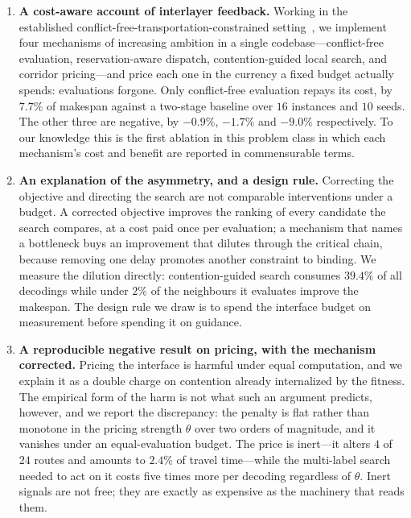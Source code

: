 \documentclass[manuscript,screen,review]{acmart}
\begin{document}
\begin{enumerate}[leftmargin=*]

\item \textbf{A cost-aware account of interlayer feedback.} Working
in the established conflict-free-\allowbreak transportation-constrained
setting~\cite{vanos2026exact}, we implement four mechanisms of increasing
ambition in a single codebase---conflict-free evaluation, reservation-aware
dispatch, contention-guided local search, and corridor pricing---and price each
one in the currency a fixed budget actually spends: evaluations forgone. Only
conflict-free evaluation repays its cost, by $7.7\%$ of makespan against a
two-stage baseline over $16$ instances and $10$ seeds. The other three are
negative, by $-0.9\%$, $-1.7\%$ and $-9.0\%$ respectively. To our knowledge this
is the first ablation in this problem class in which each mechanism's cost and
benefit are reported in commensurable terms.

\item \textbf{An explanation of the asymmetry, and a design rule.} Correcting the
objective and directing the search are not comparable interventions under a
budget. A corrected objective improves the ranking of every candidate the search
compares, at a cost paid once per evaluation; a mechanism that names a bottleneck
buys an improvement that dilutes through the critical chain, because removing one
delay promotes another constraint to binding. We measure the dilution directly:
contention-guided search consumes $39.4\%$ of all decodings while under $2\%$ of
the neighbours it evaluates improve the makespan. The design rule we draw is to
spend the interface budget on measurement before spending it on guidance.

\item \textbf{A reproducible negative result on pricing, with the mechanism
corrected.} Pricing the interface is harmful under equal computation, and we
explain it as a double charge on contention already internalized by the fitness.
The empirical form of the harm is not what such an argument predicts, however,
and we report the discrepancy: the penalty is flat rather than monotone in the
pricing strength $\theta$ over two orders of magnitude, and it vanishes under an
equal-evaluation budget. The price is inert---it alters $4$ of $24$ routes and
amounts to $2.4\%$ of travel time---while the multi-label search needed to act on
it costs five times more per decoding regardless of $\theta$. Inert signals are
not free; they are exactly as expensive as the machinery that reads them.


\end{enumerate}
\end{document}
